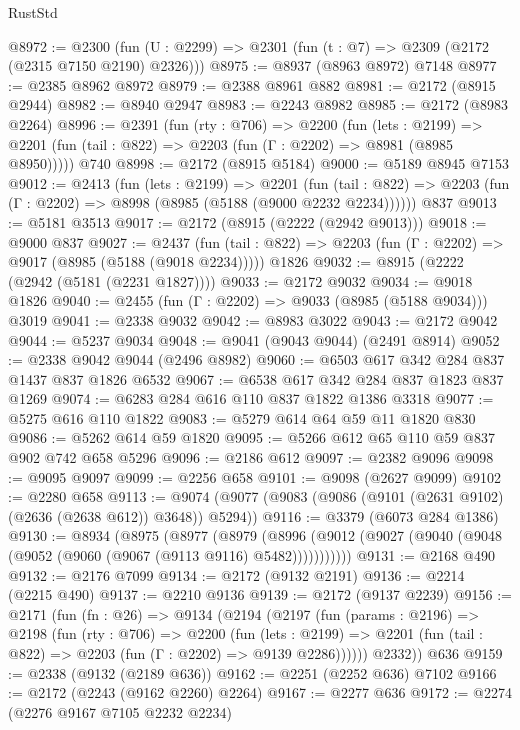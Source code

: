 \begin{lexlean}{RustStd}
\begin{coremodule}
@8972 := @2300 (fun (U : @2299) => @2301 (fun (t : @7) => @2309 (@2172 (@2315 @7150 @2190) @2326)))
@8975 := @8937 (@8963 @8972) @7148
@8977 := @2385 @8962 @8972
@8979 := @2388 @8961 @882
@8981 := @2172 (@8915 @2944)
@8982 := @8940 @2947
@8983 := @2243 @8982
@8985 := @2172 (@8983 @2264)
@8996 := @2391
    (fun (rty : @706) =>
    @2200
      (fun (lets : @2199) =>
      @2201 (fun (tail : @822) => @2203 (fun (Γ : @2202) => @8981 (@8985 @8950)))))
    @740
@8998 := @2172 (@8915 @5184)
@9000 := @5189 @8945 @7153
@9012 := @2413
    (fun (lets : @2199) =>
    @2201
      (fun (tail : @822) => @2203 (fun (Γ : @2202) => @8998 (@8985 (@5188 (@9000 @2232 @2234))))))
    @837
@9013 := @5181 @3513
@9017 := @2172 (@8915 (@2222 (@2942 @9013)))
@9018 := @9000 @837
@9027 := @2437
    (fun (tail : @822) => @2203 (fun (Γ : @2202) => @9017 (@8985 (@5188 (@9018 @2234)))))
    @1826
@9032 := @8915 (@2222 (@2942 (@5181 (@2231 @1827))))
@9033 := @2172 @9032
@9034 := @9018 @1826
@9040 := @2455 (fun (Γ : @2202) => @9033 (@8985 (@5188 @9034))) @3019
@9041 := @2338 @9032
@9042 := @8983 @3022
@9043 := @2172 @9042
@9044 := @5237 @9034
@9048 := @9041 (@9043 @9044) (@2491 @8914)
@9052 := @2338 @9042 @9044 (@2496 @8982)
@9060 := @6503 @617 @342 @284 @837 @1437 @837 @1826 @6532
@9067 := @6538 @617 @342 @284 @837 @1823 @837 @1269
@9074 := @6283 @284 @616 @110 @837 @1822 @1386 @3318
@9077 := @5275 @616 @110 @1822
@9083 := @5279 @614 @64 @59 @11 @1820 @830
@9086 := @5262 @614 @59 @1820
@9095 := @5266 @612 @65 @110 @59 @837 @902 @742 @658 @5296
@9096 := @2186 @612
@9097 := @2382 @9096
@9098 := @9095 @9097
@9099 := @2256 @658
@9101 := @9098 (@2627 @9099)
@9102 := @2280 @658
@9113 := @9074 (@9077 (@9083 (@9086 (@9101 (@2631 @9102) (@2636 (@2638 @612)) @3648)) @5294))
@9116 := @3379 (@6073 @284 @1386)
@9130 := @8934
    (@8975
      (@8977
        (@8979
          (@8996 (@9012 (@9027 (@9040 (@9048 (@9052 (@9060 (@9067 (@9113 @9116) @5482)))))))))))
@9131 := @2168 @490
@9132 := @2176 @7099
@9134 := @2172 (@9132 @2191)
@9136 := @2214 (@2215 @490)
@9137 := @2210 @9136
@9139 := @2172 (@9137 @2239)
@9156 := @2171
    (fun (fn : @26) =>
    @9134
      (@2194
        (@2197
          (fun (params : @2196) =>
          @2198
            (fun (rty : @706) =>
            @2200
              (fun (lets : @2199) =>
              @2201 (fun (tail : @822) => @2203 (fun (Γ : @2202) => @9139 @2286))))))
        @2332))
    @636
@9159 := @2338 (@9132 (@2189 @636))
@9162 := @2251 (@2252 @636) @7102
@9166 := @2172 (@2243 (@9162 @2260) @2264)
@9167 := @2277 @636
@9172 := @2274 (@2276 @9167 @7105 @2232 @2234)

\end{coremodule}
\end{lexlean}
